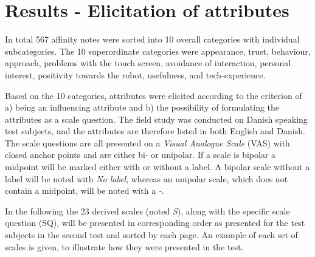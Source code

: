 \section{Results - Elicitation of attributes}
\label{ResultsElicitation}
%
In total 567 affinity notes were sorted into 10 overall categories with individual subcategories. The 10 superordinate categories were appearance, trust, behaviour, approach, problems with the touch screen, avoidance of interaction, personal interest, positivity towards the robot, usefulness, and tech-experience.

Based on the 10 categories, attributes were elicited according to the criterion of a) being an influencing attribute and b) the possibility of formulating the attributes as a scale question. The field study was conducted on Danish speaking test subjects, and the attributes are therefore listed in both English and Danish. The scale questions are all presented on a \textit{Visual Analogue Scale} (VAS) with closed anchor points and are either bi- or unipolar. If a scale is bipolar a midpoint will be marked either with or without a label. A bipolar scale without a label will be noted with \textit{No label}, whereas an unipolar scale, which does not contain a midpoint, will be noted with a \textit{-}. 

In the following the 23 derived scales (noted \textit{S}), along with the specific scale question (SQ), will be presented in corresponding order as presented for the test subjects in the second test and sorted by each page. An example of each set of scales is given, to illustrate how they were presented in the test.
